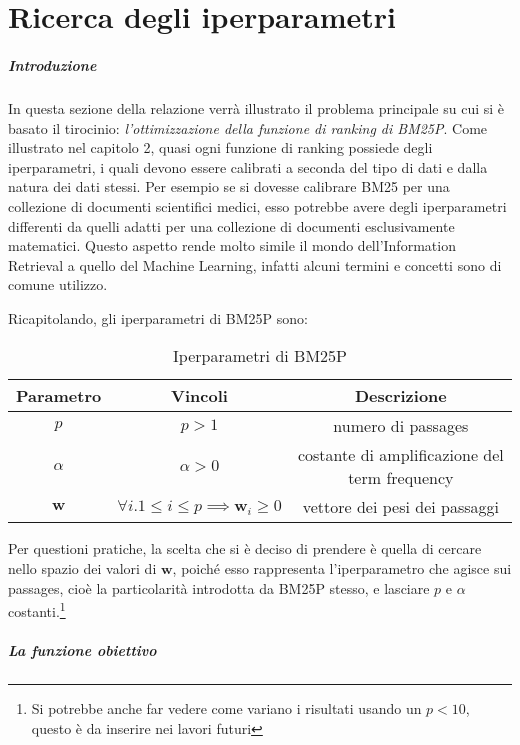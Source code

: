 \chapter{Ricerca degli iperparametri}

\paragraph{Introduzione}
In questa sezione della relazione verrà illustrato il problema principale su cui si è basato il tirocinio:
\textit{l'ottimizzazione della funzione di ranking di BM25P}.
Come illustrato nel capitolo 2, quasi ogni funzione di ranking possiede degli iperparametri, i quali
devono essere calibrati a seconda del tipo di dati e dalla natura dei dati stessi.
Per esempio se si dovesse calibrare BM25 per una collezione
di documenti scientifici medici, esso potrebbe avere degli iperparametri
differenti da quelli adatti per una collezione di documenti esclusivamente matematici.
Questo aspetto rende molto simile il mondo dell'Information Retrieval a quello del Machine Learning,
infatti alcuni termini e concetti sono di comune utilizzo.


Ricapitolando, gli iperparametri di BM25P sono:
\begin{table}[h!]
	\centering
	\begin{tabular}{|c|c|c|}
		\hline
		Parametro & Vincoli & Descrizione \\
		\hline
		$p$ & $p>1$ & numero di passages \\
		\hline
		$\alpha$ & $\alpha > 0$ & costante di amplificazione del term frequency \\
		\hline
		$\boldsymbol{w}$ & $\forall{i.1 \leq i \leq p}\implies \boldsymbol{w}_i \geq 0$ & vettore dei pesi dei passaggi \\
		\hline
	\end{tabular}
\caption{Iperparametri di BM25P}
\end{table}

Per questioni pratiche, la scelta che si è deciso di prendere è quella di cercare
nello spazio dei valori di $\boldsymbol{w}$, poiché esso rappresenta l'iperparametro
che agisce sui passages, cioè la particolarità introdotta da BM25P stesso, e lasciare
$p$ e $\alpha$ costanti.\footnote{Si potrebbe anche far vedere come variano i risultati usando un $p<10$, questo è da inserire nei lavori futuri}

\paragraph{La funzione obiettivo}

